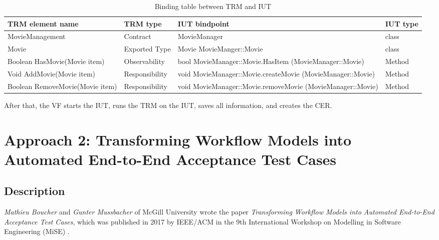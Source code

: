 \begin{table}[h] 
	\centering
	\begin{small}
		\caption{Binding table between TRM and IUT}
		\label{tab:bindingTable}
		\setlength{\tabcolsep}{1em}
		\begin{tabular}{>{\raggedright}p{3.5cm}| p{1.75cm}|>{\raggedright}p{5.8cm} |p{0.75cm} }
			\hline
			\textbf{TRM element name} & \textbf{TRM type} & \textbf{IUT bindpoint} & \textbf{IUT type} \\
			\hline	
			MovieManagement & Contract & MovieManager & class\\
			\hline
			Movie & Exported Type & Movie MovieManger::Movie & class \\
			\hline
			Boolean HasMovie(Movie item) & Observability & bool MovieManager::Movie.HasItem (MovieManager::Movie) & Method \\
			\hline
			Void AddMovie(Movie item) & Responsibility & void  MovieManager::Movie.createMovie (MovieManager::Movie) & Method \\
			\hline
			Boolean RemoveMovie(Movie item) & Responsibility & void MovieManager::Movie.removeMovie (MovieManager::Movie) & Method \\
			\hline
		\end{tabular}
	\end{small}
\end{table}

After that, the VF starts the IUT, runs the TRM on the IUT, saves all information, and creates the CER.
\section{Approach 2: Transforming Workflow Models into Automated End-to-End Acceptance Test Cases}
\label{topic08:sectionApproach2}

\subsection{Description}
\label{topic08:sectionApproach2Description}

\textit{Mathieu Boucher} and \textit{Gunter Mussbacher} of McGill University wrote the paper \textit{Transforming Workflow Models into Automated End-to-End Acceptance Test Cases}, which was published in 2017 by IEEE/ACM in the 9th International Workshop on Modelling in Software Engineering (MiSE) \cite{BoucherMussbacher2017}.

